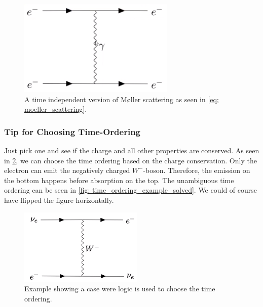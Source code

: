 \begin{figure}[h!]
\centering
\includegraphics[width = .6\textwidth]{moeller_scattering_time_independat.png}
\caption{A time independent version of Møller scattering as seen in \cref{eq: moeller_scattering}.}
\label{fig: moeller_scattering_time_independat}
\end{figure}


\subsubsection{Tip for Choosing Time-Ordering}
Just pick one and see if the charge and all other properties are conserved. As seen in \cref{fig: time_ordering_example}, we can choose the time ordering based on the charge conservation. Only the electron can emit the negatively charged $W^{-}$-boson. Therefore, the emission on the bottom happens before absorption on the top. The unambiguous time ordering can be seen in \cref{fig: time_ordering_example_solved}. We could of course have flipped the figure horizontally. 

\begin{figure}[h!]
\centering
\includegraphics[width = .6\textwidth]{time_ordering_example.png}
\caption{Example showing a case were logic is used to choose the time ordering.}
\label{fig: time_ordering_example}
\end{figure}

